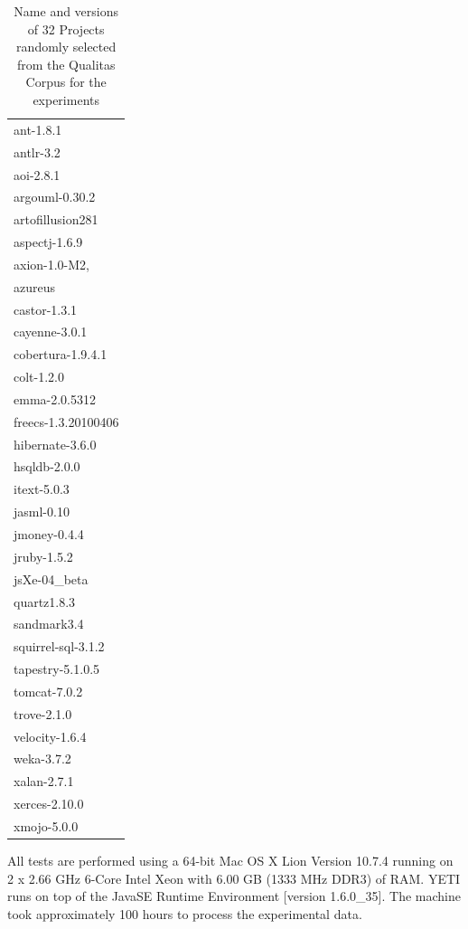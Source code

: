 \documentclass{acm_proc_article-sp}
\begin{document}
\begin{table}[h]
\caption{Name and versions of 32 Projects randomly selected from the Qualitas Corpus for the experiments}
\centering
\begin{tabular}{l}
ant-1.8.1\\
antlr-3.2\\
aoi-2.8.1\\
argouml-0.30.2\\
artofillusion281\\
aspectj-1.6.9\\
axion-1.0-M2,\\
azureus\\
castor-1.3.1\\
cayenne-3.0.1\\
cobertura-1.9.4.1\\
colt-1.2.0\\
emma-2.0.5312\\
freecs-1.3.20100406\\
hibernate-3.6.0\\
hsqldb-2.0.0\\
itext-5.0.3\\
jasml-0.10\\
jmoney-0.4.4\\
jruby-1.5.2\\
jsXe-04\_beta\\
quartz1.8.3\\
sandmark3.4\\
squirrel-sql-3.1.2\\
tapestry-5.1.0.5\\
tomcat-7.0.2\\
trove-2.1.0\\
velocity-1.6.4\\
weka-3.7.2\\
xalan-2.7.1\\
xerces-2.10.0\\
xmojo-5.0.0\\
\end{tabular}
\bigskip
\label{table:projects}
\end{table}



All tests are performed using a 64-bit Mac OS X Lion Version 10.7.4 running on 2 x 2.66 GHz 6-Core Intel Xeon with 6.00 GB (1333 MHz DDR3) of RAM. YETI runs on top of the Java\texttrademark  SE Runtime Environment [version 1.6.0\_35]. The machine took approximately 100 hours to process the experimental data.
\end{document}
